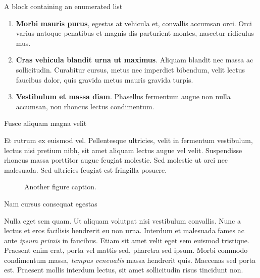 \documentclass[final]{beamer}
\newlength{\colwidth}
\begin{document}
\begin{frame}[t]
\begin{columns}[t]
\begin{column}{\colwidth}
\begin{block}{A block containing an enumerated list}
    \begin{enumerate}
      \item \textbf{Morbi mauris purus}, egestas at vehicula et, convallis
        accumsan orci. Orci varius natoque penatibus et magnis dis parturient
        montes, nascetur ridiculus mus.
      \item \textbf{Cras vehicula blandit urna ut maximus}. Aliquam blandit nec
        massa ac sollicitudin. Curabitur cursus, metus nec imperdiet bibendum,
        velit lectus faucibus dolor, quis gravida metus mauris gravida turpis.
      \item \textbf{Vestibulum et massa diam}. Phasellus fermentum augue non
        nulla accumsan, non rhoncus lectus condimentum.
    \end{enumerate}

  \end{block}

  \begin{block}{Fusce aliquam magna velit}

    Et rutrum ex euismod vel. Pellentesque ultricies, velit in fermentum
    vestibulum, lectus nisi pretium nibh, sit amet aliquam lectus augue vel
    velit. Suspendisse rhoncus massa porttitor augue feugiat molestie. Sed
    molestie ut orci nec malesuada. Sed ultricies feugiat est fringilla
    posuere.

    \begin{figure}
      \centering
      \caption{Another figure caption.}
    \end{figure}

  \end{block}

  \begin{block}{Nam cursus consequat egestas}

    Nulla eget sem quam. Ut aliquam volutpat nisi vestibulum convallis. Nunc a
    lectus et eros facilisis hendrerit eu non urna. Interdum et malesuada fames
    ac ante \textit{ipsum primis} in faucibus. Etiam sit amet velit eget sem
    euismod tristique. Praesent enim erat, porta vel mattis sed, pharetra sed
    ipsum. Morbi commodo condimentum massa, \textit{tempus venenatis} massa
    hendrerit quis. Maecenas sed porta est. Praesent mollis interdum lectus,
    sit amet sollicitudin risus tincidunt non.


\end{block}
\end{column}
\end{columns}
\end{frame}
\end{document}
